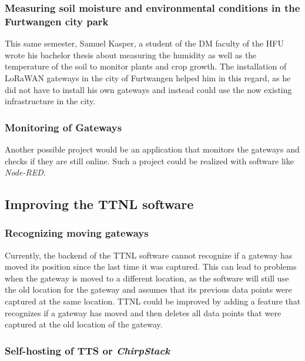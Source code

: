 \subsubsection{Measuring soil moisture and environmental conditions in the Furtwangen city park}

This same semester, Samuel Kasper, a student of the \ac{DM} faculty of the \ac{HFU} wrote his bachelor thesis about measuring the humidity as well as the temperature of the soil to monitor plants and crop growth.
The installation of \ac{LoRaWAN} gateways in the city of Furtwangen helped him in this regard, as he did not have to install his own gateways and instead could use the now existing infrastructure in the city.

\subsubsection{Monitoring of Gateways}

Another possible project would be an application that monitors the gateways and checks if they are still online.
Such a project could be realized with software like \emph{Node-RED}.

\subsection{Improving the \acf{TTNL} software}

\subsubsection{Recognizing moving gateways}

Currently, the backend of the \ac{TTNL} software cannot recognize if a gateway has moved its position since the last time it was captured.
This can lead to problems when the gateway is moved to a different location, as the software will still use the old location for the gateway and assumes that its previous data
points were captured at the same location.
\ac{TTNL} could be improved by adding a feature that recognizes if a gateway has moved and then deletes all data points that were captured at the old location of the gateway.

\subsubsection{Self-hosting of \acs{TTS} or \emph{ChirpStack}}


